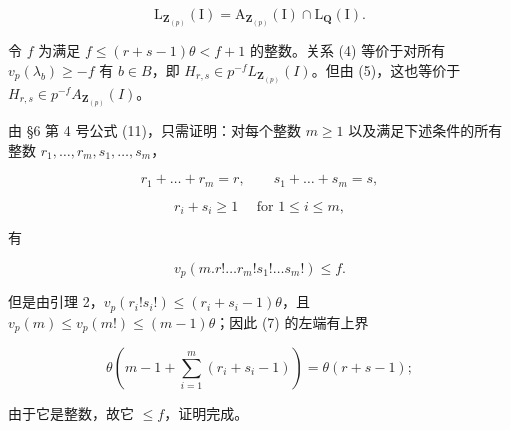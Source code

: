 \[
\mathrm{L} _ {\mathbf {Z} _ {(p)}} (\mathrm{I}) = \mathrm{A} _ {\mathbf {Z} _ {(p)}} (\mathrm{I}) \cap \mathrm{L} _ {\mathbf {Q}} (\mathrm{I}).\tag{5}
\]

令 \(f\) 为满足 \(f \leqslant (r + s - 1)\theta < f + 1\) 的整数。关系 (4) 等价于对所有 \(v_{p}(\lambda_{b}) \geqslant -f\) 有 \(b \in B\)，即 \(H_{r,s} \in p^{-f}L_{\mathbf{Z}_{(p)}}(I)\)。但由 (5)，这也等价于 \(H_{r,s} \in p^{-f}A_{\mathbf{Z}_{(p)}}(I)\)。

由 §6 第 4 号公式 (11)，只需证明：对每个整数 \(m \geqslant 1\) 以及满足下述条件的所有整数 \(r_1, \ldots, r_m, s_1, \ldots, s_m\)，

\[
r _ {1} + \dots + r _ {m} = r, \qquad s _ {1} + \dots + s _ {m} = s,\tag{6}
\]

\[
r _ {i} + s _ {i} \geqslant 1 \quad \text { for } 1 \leqslant i \leqslant m,
\]

有

\[
v _ {p} (m. r! \dots r _ {m}! s _ {1}! \dots s _ {m}!) \leqslant f.\tag{7}
\]

但是由引理 2，\(v_{p}(r_{i}!s_{i}!) \leqslant (r_{i} + s_{i} - 1)\theta\)，且 \(v_{p}(m) \leqslant v_{p}(m!) \leqslant (m - 1)\theta\)；因此 (7) 的左端有上界

\[
\theta (m - 1 + \sum_ {i = 1} ^ {m} \left(r _ {i} + s _ {i} - 1\right)) = \theta (r + s - 1);
\]

由于它是整数，故它 \(\leqslant f\)，证明完成。

